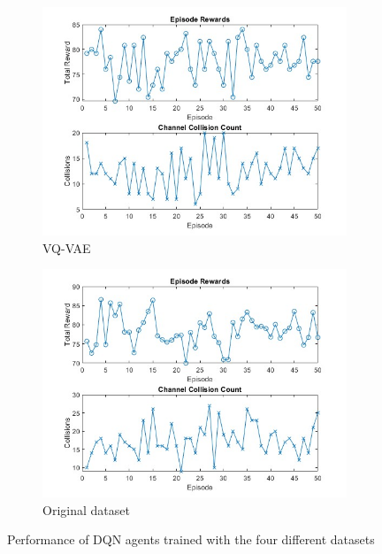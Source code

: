 \begin{figure}[htbp]
    \vspace{0.5cm} %

    \begin{subfigure}[b]{0.45\textwidth}
        \centering
        \includegraphics[width=\linewidth]{figures/collision_count_vqvae.jpg}
        \caption{VQ-VAE}
    \end{subfigure}
    \hfill
    \begin{subfigure}[b]{0.45\textwidth}
        \centering
        \includegraphics[width=\linewidth]{figures/collision_count_original.jpg}
        \caption{Original dataset}
    \end{subfigure}

    \caption{Performance of DQN agents trained with the four different datasets}
\end{figure}

